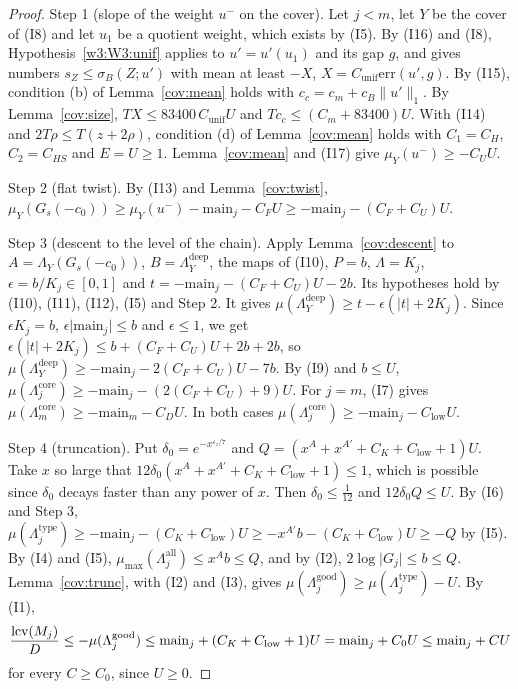 \begin{proof}
Step 1 (slope of the weight $u^-$ on the cover). Let $j<m$, let $Y$ be the cover of (I8) and let $u_1$ be a quotient weight, which exists by (I5). By (I16) and (I8), Hypothesis~\ref{w3:W3:unif} applies to $u'=u'(u_1)$ and its gap $g$, and gives numbers $s_Z\le\sigma_B(Z;u')$ with mean at least $-X$, $X=C_{\mathrm{unif}}\mathrm{err}(u',g)$. By (I15), condition (b) of Lemma~\ref{cov:mean} holds with $c_c=c_m+c_B\lVert u'\rVert_1$. By Lemma~\ref{cov:size}, $TX\le83400\,C_{\mathrm{unif}}U$ and $Tc_c\le(C_m+83400)U$. With (I14) and $2T\rho\le T(z+2\rho)$, condition (d) of Lemma~\ref{cov:mean} holds with $C_1=C_H$, $C_2=C_{HS}$ and $E=U\ge1$. Lemma~\ref{cov:mean} and (I17) give $\mu_Y(u^-)\ge-C_UU$.

Step 2 (flat twist). By (I13) and Lemma~\ref{cov:twist}, $\mu_Y(G_s(-c_0))\ge\mu_Y(u^-)-\mathrm{main}_j-C_FU\ge-\mathrm{main}_j-(C_F+C_U)U$.

Step 3 (descent to the level of the chain). Apply Lemma~\ref{cov:descent} to $A=\Lambda_Y(G_s(-c_0))$, $B=\Lambda^{\mathrm{deep}}_Y$, the maps of (I10), $P=b$, $\Lambda=K_j$, $\epsilon=b/K_j\in[0,1]$ and $t=-\mathrm{main}_j-(C_F+C_U)U-2b$. Its hypotheses hold by (I10), (I11), (I12), (I5) and Step 2. It gives $\mu(\Lambda^{\mathrm{deep}}_Y)\ge t-\epsilon(\lvert t\rvert+2K_j)$. Since $\epsilon K_j=b$, $\epsilon\lvert\mathrm{main}_j\rvert\le b$ and $\epsilon\le1$, we get $\epsilon(\lvert t\rvert+2K_j)\le b+(C_F+C_U)U+2b+2b$, so $\mu(\Lambda^{\mathrm{deep}}_Y)\ge-\mathrm{main}_j-2(C_F+C_U)U-7b$. By (I9) and $b\le U$, $\mu(\Lambda^{\mathrm{core}}_j)\ge-\mathrm{main}_j-(2(C_F+C_U)+9)U$. For $j=m$, (I7) gives $\mu(\Lambda^{\mathrm{core}}_m)\ge-\mathrm{main}_m-C_DU$. In both cases $\mu(\Lambda^{\mathrm{core}}_j)\ge-\mathrm{main}_j-C_{\mathrm{low}}U$.

Step 4 (truncation). Put $\delta_0=e^{-x^{\varepsilon_z/7}}$ and $Q=(x^A+x^{A'}+C_K+C_{\mathrm{low}}+1)U$. Take $x$ so large that $12\delta_0(x^A+x^{A'}+C_K+C_{\mathrm{low}}+1)\le1$, which is possible since $\delta_0$ decays faster than any power of $x$. Then $\delta_0\le\frac1{12}$ and $12\delta_0Q\le U$. By (I6) and Step 3, $\mu(\Lambda^{\mathrm{type}}_j)\ge-\mathrm{main}_j-(C_K+C_{\mathrm{low}})U\ge-x^{A'}b-(C_K+C_{\mathrm{low}})U\ge-Q$ by (I5). By (I4) and (I5), $\mu_{\max}(\Lambda^{\mathrm{all}}_j)\le x^Ab\le Q$, and by (I2), $2\log\lvert G_j\rvert\le b\le Q$. Lemma~\ref{cov:trunc}, with (I2) and (I3), gives $\mu(\Lambda^{\mathrm{good}}_j)\ge\mu(\Lambda^{\mathrm{type}}_j)-U$. By (I1),
\[
\frac{\operatorname{lcv}(M_j)}D\le-\mu(\Lambda^{\mathrm{good}}_j)\le\mathrm{main}_j+(C_K+C_{\mathrm{low}}+1)U=\mathrm{main}_j+C_0U\le\mathrm{main}_j+CU
\]
for every $C\ge C_0$, since $U\ge0$.
\end{proof}

